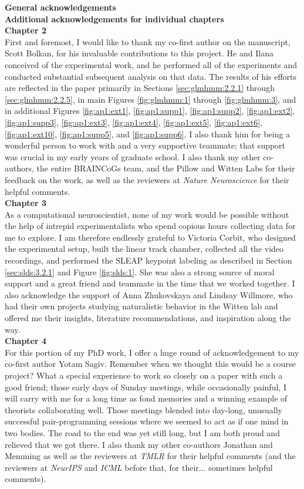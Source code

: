 {\large \textbf{General acknowledgements}} \\
{\large \textbf{Additional acknowledgements for individual chapters}}\\
\textbf{Chapter 2} \\
First and foremost, I would like to thank my co-first author on the manuscript, Scott Bolkan, for his invaluable contributions to this project. He and Ilana conceived of the experimental work, and he performed all of the experiments and conducted substantial subsequent analysis on that data. The results of his efforts are reflected in the paper primarily in Sections \ref{sec:glmhmm:2.2.1} through \ref{sec:glmhmm:2.2.5}, in main Figures \ref{fig:glmhmm:1} through \ref{fig:glmhmm:3}, and in additional Figures \ref{fig:ap1:ext1}, \ref{fig:ap1:supp1}, \ref{fig:ap1:supp2}, \ref{fig:ap1:ext2}, \ref{fig:ap1:supp3}, \ref{fig:ap1:ext3}, \ref{fig:ap1:ext4}, \ref{fig:ap1:ext5}, \ref{fig:ap1:ext6}, \ref{fig:ap1:ext10}, \ref{fig:ap1:supp5}, and \ref{fig:ap1:supp6}. I also thank him for being a wonderful person to work with and a very supportive teammate; that support was crucial in my early years of graduate school. I also thank my other co-authors, the entire BRAINCoGs team, and the Pillow and Witten Labs for their feedback on the work, as well as the reviewers at \textit{Nature Neuroscience} for their helpful comments. \\
\textbf{Chapter 3} \\
As a computational neuroscientist, none of my work would be possible without the help of intrepid experimentalists who spend copious hours collecting data for me to explore. I am therefore endlessly grateful to Victoria Corbit, who designed the experimental setup, built the linear track chamber, collected all the video recordings, and performed the SLEAP keypoint labeling as described in Section \ref{sec:slds:3.2.1} and Figure \ref{fig:slds:1}. She was also a strong source of moral support and a great friend and teammate in the time that we worked together. I also acknowledge the support of Anna Zhukovskaya and Lindsay Willmore, who had their own projects studying naturalistic behavior in the Witten lab and offered me their insights, literature recommendations, and inspiration along the way. \\
\textbf{Chapter 4} \\
For this portion of my PhD work, I offer a huge round of acknowledgement to my co-first author Yotam Sagiv. Remember when we thought this would be a course project? What a special experience to work so closely on a paper with such a good friend; those early days of Sunday meetings, while occasionally painful, I will carry with me for a long time as fond memories and a winning example of theorists collaborating well. Those meetings blended into day-long, unusually successful pair-programming sessions where we seemed to act as if one mind in two bodies. The road to the end was yet still long, but I am both proud and relieved that we got there. I also thank my other co-authors Jonathan and Memming  as well as the reviewers at \textit{TMLR} for their helpful comments (and the reviewers at \textit{NeurIPS} and \textit{ICML} before that, for their... sometimes helpful comments). \\